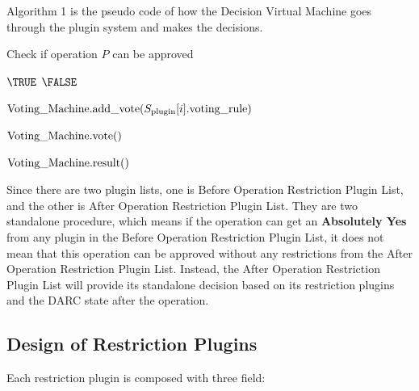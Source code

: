 \documentclass[main.tex]{subfiles}
\begin{document}
Algorithm 1 is the pseudo code of how the Decision Virtual Machine goes through the plugin system and makes the decisions.


\begin{algorithm}
\caption{Check if operation $P$ can be approved}
\begin{algorithmic} 


\RETURN $ \TRUE $
\RETURN $ \FALSE $
\ENDIF
\ENDFOR



\STATE ${\text{Voting\textunderscore Machine.add\textunderscore vote(}} S_{\text{plugin}} [i].\text{voting\textunderscore rule} \text{)} $
\ENDIF
\ENDFOR

\STATE $\text{Voting\textunderscore Machine.vote()} $

\RETURN $ \text{Voting\textunderscore Machine.result()} $ 
\end{algorithmic}
\end{algorithm}

Since there are two plugin lists, one is Before Operation Restriction Plugin List, and the other is After Operation Restriction Plugin List. They are two standalone procedure, which means if the operation can get an \textbf{Absolutely Yes} from any plugin in the Before Operation Restriction Plugin List, it does not mean that this operation can be approved without any restrictions from the After Operation Restriction Plugin List. Instead, the After Operation Restriction Plugin List will provide its standalone decision based on its restriction plugins and the DARC state after the operation.

\subsection{Design of Restriction Plugins}

Each restriction plugin is composed with three field: 
\end{document}

